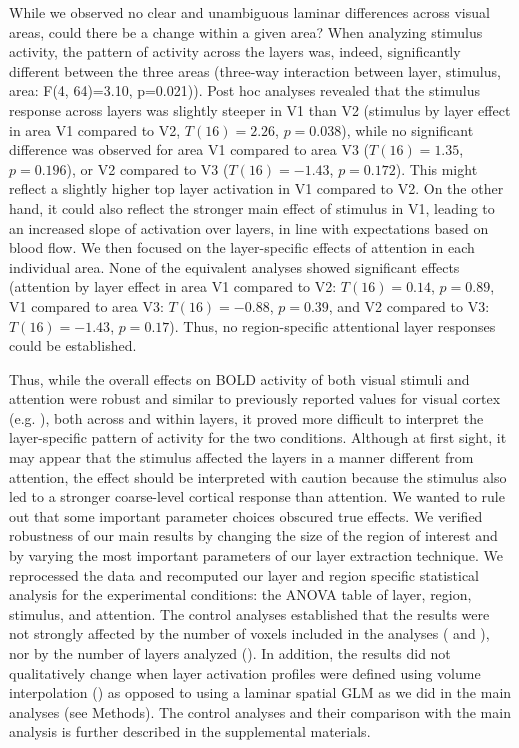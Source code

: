 \documentclass[9pt,lineno]{aperture}
\begin{document}
While we observed no clear and unambiguous laminar differences across visual areas, could there be a change within a given area? When analyzing stimulus activity, the pattern of activity across the layers was, indeed, significantly different between the three areas (three-way interaction between layer, stimulus, area: F(4, 64)=3.10, p=0.021)). Post hoc analyses revealed that the stimulus response across layers was slightly steeper in V1 than V2 (stimulus by layer effect in area V1 compared to V2, $T(16)=2.26$, $p=0.038$), while no significant difference was observed for area V1 compared to area V3 ($T(16)=1.35$, $p=0.196$), or V2 compared to V3 ($T(16)=-1.43$, $p=0.172$). This might reflect a slightly higher top layer activation in V1 compared to V2. On the other hand, it could also reflect the stronger main effect of stimulus in V1, leading to an increased slope of activation over layers, in line with expectations based on blood flow. We then focused on the layer-specific effects of attention in each individual area.
None of the equivalent analyses showed significant effects (attention by layer effect in area V1 compared to V2: $T(16)=0.14$, $p=0.89$, V1 compared to area V3: $T(16)=-0.88$, $p=0.39$, and V2 compared to V3: $T(16)=-1.43$, $p=0.17$). Thus, no region-specific attentional layer responses could be established.





Thus, while the overall effects on BOLD activity of both visual stimuli and attention were robust and similar to previously reported values for visual cortex (e.g. \citep{Kastner1999,Jehee2011, Koopmans2010}), both across and within layers, it proved more difficult to interpret the layer-specific pattern of activity for the two conditions. Although at first sight, it may appear that the stimulus affected the layers in a manner different from attention, the effect should be interpreted with caution because the stimulus also led to a stronger coarse-level cortical response than attention. 
We wanted to rule out that some important parameter choices obscured true effects. We verified robustness of our main results by changing the size of the region of interest and by varying the most important parameters of our layer extraction technique. We reprocessed the data and recomputed our layer and region specific statistical analysis for the experimental conditions: the ANOVA table of layer, region, stimulus, and attention. The control analyses established that the results were not strongly affected by the number of voxels included in the analyses ( and ), nor by the number of layers analyzed (). In addition, the results did not qualitatively change when layer activation profiles were defined using volume interpolation () as opposed to using a laminar spatial GLM as we did in the main analyses (see Methods). The control analyses and their comparison with the main analysis is further described in the supplemental materials. 
\end{document}
